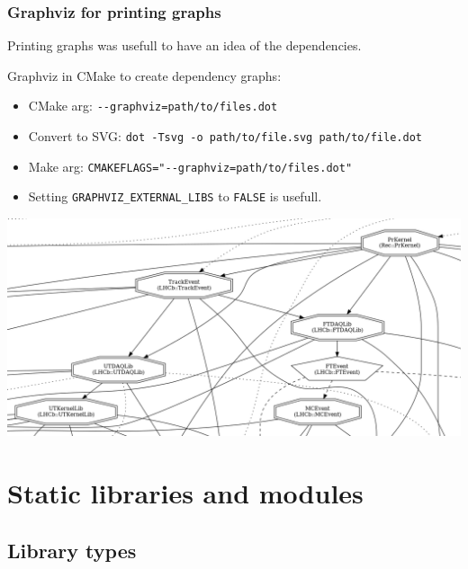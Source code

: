 \documentclass{beamer}
\begin{document}
\begin{frame}[fragile]
    \frametitle{Graphviz for printing graphs}

    Printing graphs was usefull to have an idea of the dependencies.

    Graphviz in CMake to create dependency graphs:
    \begin{itemize}
        \item CMake arg: \verb'--graphviz=path/to/files.dot'
        \item Convert to SVG: \verb'dot -Tsvg -o path/to/file.svg path/to/file.dot'
        \item Make arg: \verb'CMAKEFLAGS="--graphviz=path/to/files.dot"'
        \item Setting \verb'GRAPHVIZ_EXTERNAL_LIBS' to \verb'FALSE' is usefull.
    \end{itemize}

\end{frame}

\begin{frame}
    \includegraphics[width=\textwidth]{graphviz_cropped.png}
\end{frame}

\section{Static libraries and modules}

\begin{frame}
    \tableofcontents[currentsection]
\end{frame}

\subsection{Library types}
\end{document}

